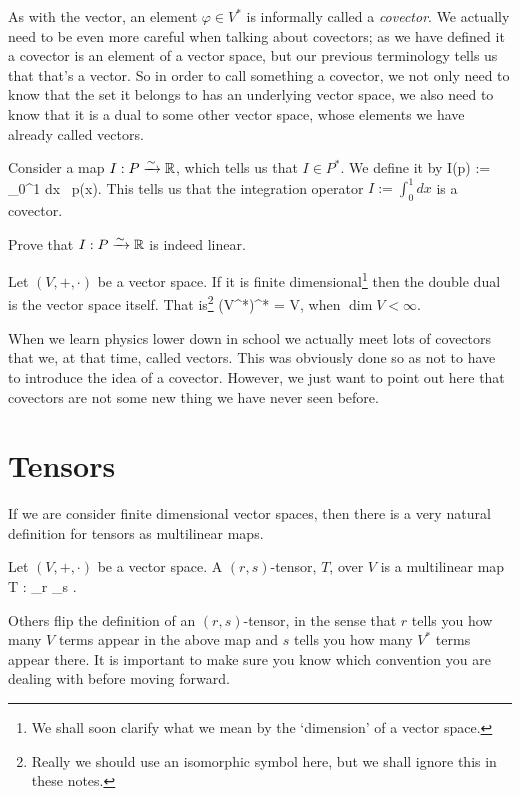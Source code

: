 \bter 
    As with the vector, an element $\varphi\in V^*$ is informally called a \textit{covector}. 
\eter 
We actually need to be even more careful when talking about covectors; as we have defined it a covector is an element of a vector space, but our previous terminology tells us that that's a vector. So in order to call something a covector, we not only need to know that the set it belongs to has an underlying vector space, we also need to know that it is a dual to some other vector space, whose elements we have already called vectors. 

\bex 
    Consider a map $I : P \xrightarrow{\sim} \mathbb{R}$, which tells us that $I\in P^*$. We define it by 
    \bse 
        I(p) := \int_0^1 dx \, p(x).
    \ese 
    This tells us that the integration operator $I := \int_0^1dx$ is a covector. 
\eex 

\bbox 
    Prove that $I:P\xrightarrow{\sim} \mathbb{R}$ is indeed linear. 
\ebox 

\bt 
\label{thrm:DoubleDualV}
    Let $(V,+,\cdot)$ be a vector space. If it is finite dimensional\footnote{We shall soon clarify what we mean by the `dimension' of a vector space.} then the double dual is the vector space itself. That is\footnote{Really we should use an isomorphic symbol here, but we shall ignore this in these notes.}
    \bse 
        (V^*)^* = V,
    \ese 
    when $\dim V<\infty$. 
\et 

\br 
    When we learn physics lower down in school we actually meet lots of covectors that we, at that time, called vectors. This was obviously done so as not to have to introduce the idea of a covector. However, we just want to point out here that covectors are not some new thing we have never seen before. 
\er 

\section{Tensors}

If we are consider finite dimensional vector spaces, then there is a very natural definition for tensors as multilinear maps. 

\bd[Tensor] 
    Let $(V,+,\cdot)$ be a vector space. A $(r,s)$-tensor, $T$, over $V$ is a multilinear map 
    \bse 
        T : _{r} \times {}_{s} \lmap \R. 
    \ese 
\ed 

\br 
    Others flip the definition of an $(r,s)$-tensor, in the sense that $r$ tells you how many $V$ terms appear in the above map and $s$ tells you how many $V^*$ terms appear there. It is important to make sure you know which convention you are dealing with before moving forward. 
\er 

